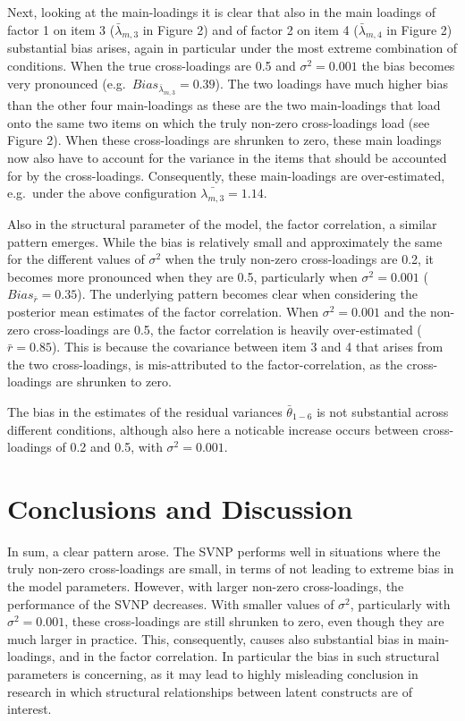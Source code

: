 \documentclass[
  man,floatsintext]{apa6}
\begin{document}
Next, looking at the main-loadings it is clear that also in the main loadings of factor 1 on item 3 (\(\bar{\lambda}_{m, 3}\) in Figure 2) and of factor 2 on item 4 (\(\bar{\lambda}_{m, 4}\) in Figure 2) substantial bias arises, again in particular under the most extreme combination of conditions. When the true cross-loadings are 0.5 and \(\sigma^2 = 0.001\) the bias becomes very pronounced (e.g.~\(Bias_{\bar{\lambda}_{m, 3}} = 0.39\)). The two loadings have much higher bias than the other four main-loadings as these are the two main-loadings that load onto the same two items on which the truly non-zero cross-loadings load (see Figure 2). When these cross-loadings are shrunken to zero, these main loadings now also have to account for the variance in the items that should be accounted for by the cross-loadings. Consequently, these main-loadings are over-estimated, e.g.~under the above configuration \(\bar{\lambda_{m, 3}} = 1.14\).

Also in the structural parameter of the model, the factor correlation, a similar pattern emerges. While the bias is relatively small and approximately the same for the different values of \(\sigma^2\) when the truly non-zero cross-loadings are 0.2, it becomes more pronounced when they are 0.5, particularly when \(\sigma^2 = 0.001\) (\(Bias_{\bar{r}} = 0.35\)). The underlying pattern becomes clear when considering the posterior mean estimates of the factor correlation. When \(\sigma^2 = 0.001\) and the non-zero cross-loadings are 0.5, the factor correlation is heavily over-estimated (\(\bar{r} = 0.85\)). This is because the covariance between item 3 and 4 that arises from the two cross-loadings, is mis-attributed to the factor-correlation, as the cross-loadings are shrunken to zero.

The bias in the estimates of the residual variances \(\bar{\theta}_{1-6}\) is not substantial across different conditions, although also here a noticable increase occurs between cross-loadings of 0.2 and 0.5, with \(\sigma^2 = 0.001\).

\hypertarget{conclusions-and-discussion}{%
\section{Conclusions and Discussion}\label{conclusions-and-discussion}}

In sum, a clear pattern arose. The SVNP performs well in situations where the truly non-zero cross-loadings are small, in terms of not leading to extreme bias in the model parameters. However, with larger non-zero cross-loadings, the performance of the SVNP decreases. With smaller values of \(\sigma^2\), particularly with \(\sigma^2 = 0.001\), these cross-loadings are still shrunken to zero, even though they are much larger in practice. This, consequently, causes also substantial bias in main-loadings, and in the factor correlation. In particular the bias in such structural parameters is concerning, as it may lead to highly misleading conclusion in research in which structural relationships between latent constructs are of interest.
\end{document}
